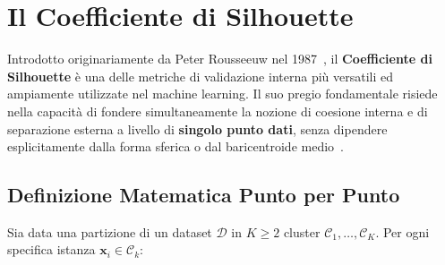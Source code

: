 \section{Il Coefficiente di Silhouette}
\label{sec:dm-silhouette-coefficient}

Introdotto originariamente da Peter Rousseeuw nel 1987~\cite{rousseeuw1987}, il \textbf{Coefficiente di Silhouette} è una delle metriche di validazione interna più versatili ed ampiamente utilizzate nel machine learning. Il suo pregio fondamentale risiede nella capacità di fondere simultaneamente la nozione di coesione interna e di separazione esterna a livello di \textbf{singolo punto dati}, senza dipendere esplicitamente dalla forma sferica o dal baricentroide medio~\cite{tan2018}.

\FloatBarrier
\subsection{Definizione Matematica Punto per Punto}
Sia data una partizione di un dataset $\mathcal{D}$ in $K \ge 2$ cluster $\mathcal{C}_1, \dots, \mathcal{C}_K$. Per ogni specifica istanza $\mathbf{x}_i \in \mathcal{C}_k$:

